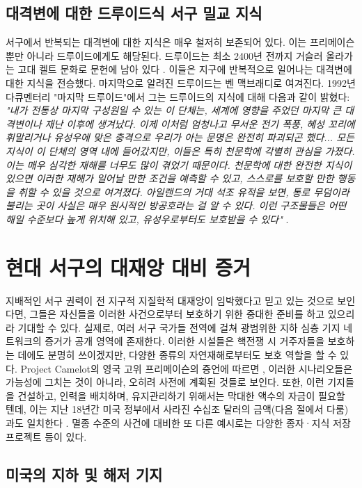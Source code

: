\documentclass[10pt,twocolumn,letterpaper]{article}
\begin{document}
\subsection{대격변에 대한 드루이드식 서구 밀교 지식}

서구에서 반복되는 대격변에 대한 지식은 매우 철저히 보존되어 있다. 이는 프리메이슨뿐만 아니라 드루이드에게도 해당된다. 드루이드는 최소 2400년 전까지 거슬러 올라가는 고대 켈트 문화로 문헌에 남아 있다 \cite{7}. 이들은 지구에 반복적으로 일어나는 대격변에 대한 지식을 전승했다. 마지막으로 알려진 드루이드는 벤 맥브래디로 여겨진다. 1992년 다큐멘터리 "마지막 드루이드"에서 그는 드루이드의 지식에 대해 다음과 같이 밝혔다: \textit{"내가 전통상 마지막 구성원일 수 있는 이 단체는, 세계에 영향을 주었던 마지막 큰 대격변이나 재난 이후에 생겨났다. 이제 이처럼 엄청나고 무서운 전기 폭풍, 혜성 꼬리에 휘말리거나 유성우에 맞은 충격으로 우리가 아는 문명은 완전히 파괴되곤 했다... 모든 지식이 이 단체의 영역 내에 들어갔지만, 이들은 특히 천문학에 각별히 관심을 가졌다. 이는 매우 심각한 재해를 너무도 많이 겪었기 때문이다. 천문학에 대한 완전한 지식이 있으면 이러한 재해가 일어날 만한 조건을 예측할 수 있고, 스스로를 보호할 만한 행동을 취할 수 있을 것으로 여겨졌다. 아일랜드의 거대 석조 유적을 보면, 통로 무덤이라 불리는 곳이 사실은 매우 원시적인 방공호라는 걸 알 수 있다. 이런 구조물들은 어떤 해일 수준보다 높게 위치해 있고, 유성우로부터도 보호받을 수 있다"} \cite{8,9}.
\section{현대 서구의 대재앙 대비 증거}

지배적인 서구 권력이 전 지구적 지질학적 대재앙이 임박했다고 믿고 있는 것으로 보인다면, 그들은 자신들을 이러한 사건으로부터 보호하기 위한 중대한 준비를 하고 있으리라 기대할 수 있다. 실제로, 여러 서구 국가들 전역에 걸쳐 광범위한 지하 심층 기지 네트워크의 증거가 공개 영역에 존재한다. 이러한 시설들은 핵전쟁 시 거주자들을 보호하는 데에도 분명히 쓰이겠지만, 다양한 종류의 자연재해로부터도 보호 역할을 할 수 있다. Project Camelot의 영국 고위 프리메이슨의 증언에 따르면 \cite{4,6}, 이러한 시나리오들은 가능성에 그치는 것이 아니라, 오히려 사전에 계획된 것들로 보인다. 또한, 이런 기지들을 건설하고, 인력을 배치하며, 유지관리하기 위해서는 막대한 액수의 자금이 필요할 텐데, 이는 지난 18년간 미국 정부에서 사라진 수십조 달러의 금액(다음 절에서 다룸)과도 일치한다 \cite{11,12,13}. 멸종 수준의 사건에 대비한 또 다른 예시로는 다양한 종자·지식 저장 프로젝트 등이 있다.

\subsection{미국의 지하 및 해저 기지}
\end{document}
